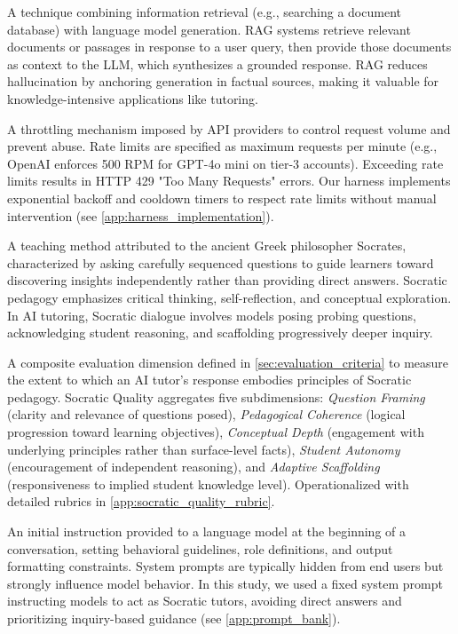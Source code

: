 \begin{description}[style=nextline,leftmargin=0em,itemsep=1em]
\item[\textbf{RAG (Retrieval-Augmented Generation)}] A technique combining information retrieval (e.g., searching a document database) with language model generation. RAG systems retrieve relevant documents or passages in response to a user query, then provide those documents as context to the LLM, which synthesizes a grounded response. RAG reduces hallucination by anchoring generation in factual sources, making it valuable for knowledge-intensive applications like tutoring.

\item[\textbf{Rate Limiting}] A throttling mechanism imposed by API providers to control request volume and prevent abuse. Rate limits are specified as maximum requests per minute (e.g., OpenAI enforces 500 RPM for GPT-4o mini on tier-3 accounts). Exceeding rate limits results in HTTP 429 "Too Many Requests" errors. Our harness implements exponential backoff and cooldown timers to respect rate limits without manual intervention (see \cref{app:harness_implementation}).

\item[\textbf{Socratic Dialogue}] A teaching method attributed to the ancient Greek philosopher Socrates, characterized by asking carefully sequenced questions to guide learners toward discovering insights independently rather than providing direct answers. Socratic pedagogy emphasizes critical thinking, self-reflection, and conceptual exploration. In AI tutoring, Socratic dialogue involves models posing probing questions, acknowledging student reasoning, and scaffolding progressively deeper inquiry.

\item[\textbf{Socratic Quality}] A composite evaluation dimension defined in \cref{sec:evaluation_criteria} to measure the extent to which an AI tutor's response embodies principles of Socratic pedagogy. Socratic Quality aggregates five subdimensions: \textit{Question Framing} (clarity and relevance of questions posed), \textit{Pedagogical Coherence} (logical progression toward learning objectives), \textit{Conceptual Depth} (engagement with underlying principles rather than surface-level facts), \textit{Student Autonomy} (encouragement of independent reasoning), and \textit{Adaptive Scaffolding} (responsiveness to implied student knowledge level). Operationalized with detailed rubrics in \cref{app:socratic_quality_rubric}.

\item[\textbf{System Prompt}] An initial instruction provided to a language model at the beginning of a conversation, setting behavioral guidelines, role definitions, and output formatting constraints. System prompts are typically hidden from end users but strongly influence model behavior. In this study, we used a fixed system prompt instructing models to act as Socratic tutors, avoiding direct answers and prioritizing inquiry-based guidance (see \cref{app:prompt_bank}).


\end{description}
